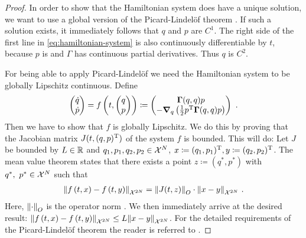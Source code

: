 \begin{proof}
	In order to show that the Hamiltonian system does have a unique solution, we want to use a global version of the Picard-Lindelöf theorem \cite[Theorem~1.2.3]{arino06}.
	If such a solution exists, it immediately follows that $q$ and $p$ are $C^1$.
	The right side of the first line in \cref{eq:hamiltonian-system} is also continuously differentiable by $t$, because $p$ is and $\Gamma$ has continuous partial derivatives.
	Thus $q$ is $C^2$.
	
	For being able to apply Picard-Lindelöf we need the Hamiltonian system to be globally Lipschitz continuous.
	Define
	\begin{equation}
	\label{eq:hamiltonian-time-derivative}
		\begin{pmatrix}
			\dot{q}\\ \dot{p}
		\end{pmatrix}
		= f\left(t, \begin{pmatrix}q\\ p\end{pmatrix}\right) 
		\coloneqq 			
		\begin{pmatrix}
			\mathbf{\Gamma}(q, q)p\\ 
			-\grad_q \left(\frac{1}{2} p^\mathrm{T} \mathbf{\Gamma}(q, q) p\right)
		\end{pmatrix} \ .
	\end{equation}
	Then we have to show that $f$ is globally Lipschitz.
	We do this by proving that the Jacobian matrix $J(t, (q, p)^{\mathrm{T}})$ of the system $f$ is bounded.
	This will do:
	Let $J$ be bounded by $L \in \mathbb{R}$ and $q_1, p_1, q_2, p_2 \in \mathcal{X}^N$, $x \coloneqq (q_1, p_1)^{\mathrm{T}}, y \coloneqq (q_2, p_2)^{\mathrm{T}}$.
	The mean value theorem states that there exists a point $z \coloneqq (q^\ast, p^\ast)$ with $q^\ast,\ p^\ast \in \mathcal{X}^N$ such that
	\begin{align}
		\norm{f\left(t, x\right) - f\left(t, y\right)}_{\mathcal{X}^{2N}}
		= \norm{J(t, z)}_O\cdot \norm{x-y}_{\mathcal{X}^{2N}} \ .
	\end{align}
	Here, $\norm{\cdot}_O$ is the operator norm \cite{conway07}.
	We then immediately arrive at the desired result:
	$\norm{f\left(t, x\right) - f\left(t, y\right)}_{\mathcal{X}^{2N}} \leq L \norm{x - y}_{\mathcal{X}^{2N}}$.
	For the detailed requirements of the Picard-Lindelöf theorem the reader is referred to \cite{arino06}.
	

\end{proof}
